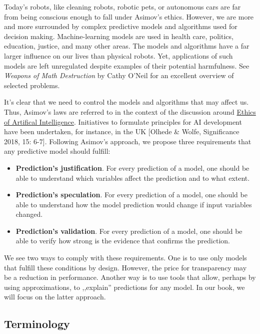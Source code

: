 \documentclass[12pt,]{krantz}
\providecommand{\tightlist}{%
  \setlength{\itemsep}{0pt}\setlength{\parskip}{0pt}}
\theoremstyle{definition}
\theoremstyle{definition}
\theoremstyle{definition}
\theoremstyle{remark}
\begin{document}
Today's robots, like cleaning robots, robotic pets, or autonomous cars
are far from being conscious enough to fall under Asimov's ethics.
However, we are more and more surrounded by complex predictive models
and algorithms used for decision making. Machine-learning models are
used in health care, politics, education, justice, and many other areas.
The models and algorithms have a far larger influence on our lives than
physical robots. Yet, applications of such models are left unregulated
despite examples of their potential harmfulness. See \emph{Weapons of
Math Destruction} by Cathy O'Neil \citep{ONeil} for an excellent
overview of selected problems.

It's clear that we need to control the models and algorithms that may
affect us. Thus, Asimov's laws are referred to in the context of the
discussion around
\href{https://en.wikipedia.org/wiki/Ethics_of_artificial_intelligence}{Ethics
of Artifical Intelligence}. Initiatives to formulate principles for AI
development have been undertaken, for instance, in the UK {[}Olhede \&
Wolfe, Significance 2018, 15: 6-7{]}. Following Asimov's approach, we
propose three requirements that any predictive model should fulfill:

\begin{itemize}
\tightlist
\item
  \textbf{Prediction's justification}. For every prediction of a model,
  one should be able to understand which variables affect the prediction
  and to what extent.
\item
  \textbf{Prediction's speculation}. For every prediction of a model,
  one should be able to understand how the model prediction would change
  if input variables changed.
\item
  \textbf{Prediction's validation}. For every prediction of a model, one
  should be able to verify how strong is the evidence that confirms the
  prediction.
\end{itemize}

We see two ways to comply with these requirements. One is to use only
models that fulfill these conditions by design. However, the price for
transparency may be a reduction in performance. Another way is to use
tools that allow, perhaps by using approximations, to ,,explain''
predictions for any model. In our book, we will focus on the latter
approach.

\hypertarget{terminology}{%
\subsection{Terminology}\label{terminology}}
\end{document}
